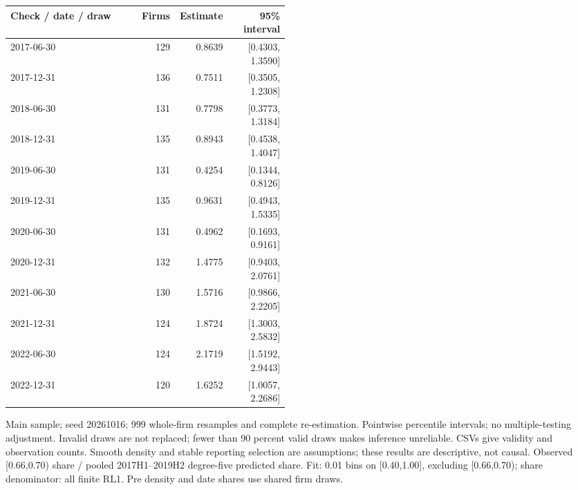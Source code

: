 \begin{threeparttable}
\begin{tabular}{p{0.47\linewidth}rrr}
\toprule
Check / date / draw & Firms & Estimate & 95\% interval \\
\midrule
2017-06-30 & 129 & 0.8639 & [0.4303, 1.3590] \\
2017-12-31 & 136 & 0.7511 & [0.3505, 1.2308] \\
2018-06-30 & 131 & 0.7798 & [0.3773, 1.3184] \\
2018-12-31 & 135 & 0.8943 & [0.4538, 1.4047] \\
2019-06-30 & 131 & 0.4254 & [0.1344, 0.8126] \\
2019-12-31 & 135 & 0.9631 & [0.4943, 1.5335] \\
2020-06-30 & 131 & 0.4962 & [0.1693, 0.9161] \\
2020-12-31 & 132 & 1.4775 & [0.9403, 2.0761] \\
2021-06-30 & 130 & 1.5716 & [0.9866, 2.2205] \\
2021-12-31 & 124 & 1.8724 & [1.3003, 2.5832] \\
2022-06-30 & 124 & 2.1719 & [1.5192, 2.9443] \\
2022-12-31 & 120 & 1.6252 & [1.0057, 2.2686] \\
\bottomrule
\end{tabular}
\begin{tablenotes}[flushleft]\footnotesize
\item[] Main sample; seed 20261016; 999 whole-firm resamples and complete re-estimation. Pointwise percentile intervals; no multiple-testing adjustment. Invalid draws are not replaced; fewer than 90 percent valid draws makes inference unreliable. CSVs give validity and observation counts. Smooth density and stable reporting selection are assumptions; these results are descriptive, not causal. Observed [0.66,0.70) share / pooled 2017H1--2019H2 degree-five predicted share. Fit: 0.01 bins on [0.40,1.00], excluding [0.66,0.70); share denominator: all finite RL1. Pre density and date shares use shared firm draws.
\end{tablenotes}
\end{threeparttable}
\par\medskip
